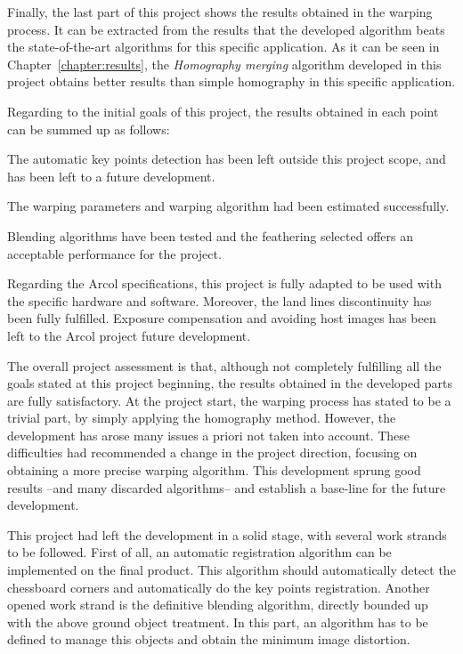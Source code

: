 Finally, the last part of this project shows the results obtained in the warping process. It can be extracted from the results that the developed algorithm beats the state-of-the-art algorithms for this specific application. As it can be seen in Chapter~\ref{chapter:results}, the \emph{Homography merging} algorithm developed in this project obtains better results than simple homography in this specific application.

Regarding to the initial goals of this project, the results obtained in each point can be summed up as follows:
\vspace{-1em}
\begin{description}[font=\normalfont\textsl]\itemsep2pt \parskip1pt 
\item [Representative points automatic detection.] The automatic key points detection has been left outside this project scope, and has been left to a future development. 
\item [Estimate the warping parameters. ]The warping parameters and warping algorithm had been estimated successfully.
\item [Blending the results on the final stitching. ]Blending algorithms have been tested and the feathering selected offers an acceptable performance for the project.
\item [Follow the requirements stated by the Arcol project. ]Regarding the Arcol specifications, this project is fully adapted to be used with the specific hardware and software. Moreover, the land lines discontinuity has been fully fulfilled. Exposure compensation and avoiding host images has been left to the Arcol project future development.
\vspace{-1em}
\end{description}

The overall project assessment is that, although not completely fulfilling all the goals stated at this project beginning, the results obtained in the developed parts are fully satisfactory. At the project start, the warping process has stated to be a trivial part, by simply applying the homography method. However, the development has arose many issues a priori not taken into account. These difficulties had recommended a change in the project direction, focusing on obtaining a more precise warping algorithm. This development sprung good results --and many discarded algorithms-- and establish a base-line for the future development.

This project had left the development in a solid stage, with several work strands to be followed. First of all, an automatic registration algorithm can be implemented on the final product. This algorithm should automatically detect the chessboard corners and automatically do the key points registration. Another opened work strand is the definitive blending algorithm, directly bounded up with the above ground object treatment.  In this part, an algorithm has to be defined to manage this objects and obtain the minimum image distortion.







